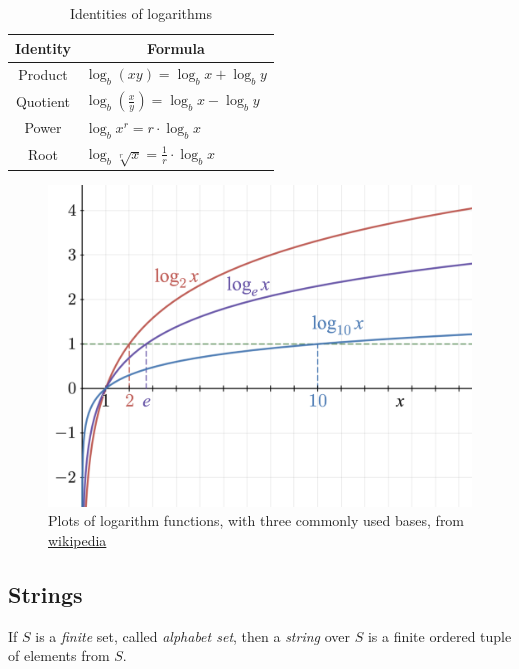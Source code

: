 \begin{table}[h]
    \centering
    \renewcommand{\arraystretch}{1.3} %
    \caption{Identities of logarithms}
    \vspace{1em}
    \begin{tabular}{c||l}
    \hline
    Identity & \multicolumn{1}{c}{Formula}  \\
    \hline
    
    Product & $\log_b(xy) = \log_b x + \log_b y$ \\

    Quotient & $\log_b(\frac{x}{y}) = \log_b x - \log_b y$ \\

    Power & $\log_b x^r = r \cdot \log_b x$ \\

    Root & $\log_b \sqrt[r]{x} = \frac{1}{r} \cdot \log_b x$ \\
    \hline
\end{tabular}
\end{table}






\begin{figure}[ht!]
    \centering
    \includegraphics[width=.5\textwidth]{fig/logarithm.png}
    \caption{Plots of logarithm functions, with three commonly used bases, from \href{https://en.wikipedia.org/wiki/Logarithm}{wikipedia}}
    \label{fig: logarithm}
\end{figure}





\subsection{Strings}

If $S$ is a \textit{finite} set, called \textit{alphabet set}, 
then a \textit{string} over $S$ is a finite ordered tuple of elements from $S$. 

